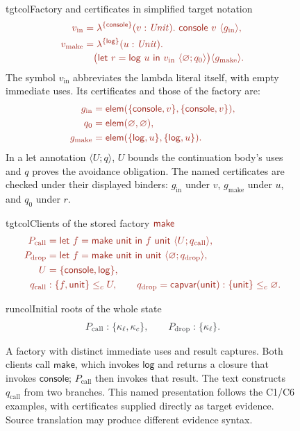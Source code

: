 \begin{figure}[!hbp]
\begin{examplepanel}{tgtcol}{Factory and certificates in simplified target notation}
\small
\[
\tgt{\begin{aligned}
 v_{\mathrm{in}}
   &=\lambda^{\{\ev{console}\}}(v:\ty{Unit}).\
      \ev{console}\ v\ \langle g_{\mathrm{in}}\rangle,\\
 v_{\mathrm{make}}
   &=\lambda^{\{\ev{log}\}}(u:\ty{Unit}).\\[-2pt]
   &\quad
      \bigl(\ev{let}\ r=\ev{log}\ u\ \ev{in}\
         v_{\mathrm{in}}\ \langle\varnothing;q_0\rangle\bigr)
       \langle g_{\mathrm{make}}\rangle .
\end{aligned}}
\]
The symbol \(v_{\mathrm{in}}\) abbreviates the lambda literal itself,
with empty immediate uses. Its certificates and those of the factory are:
\[
\tgt{\begin{aligned}
 g_{\mathrm{in}}&=\ev{elem}(\{\ev{console},v\},\{\ev{console},v\}),\\
 q_0&=\ev{elem}(\varnothing,\varnothing),\\
 g_{\mathrm{make}}&=\ev{elem}(\{\ev{log},u\},\{\ev{log},u\}).
\end{aligned}}
\]
In a let annotation \(\langle U;q\rangle\), \(U\) bounds the continuation
body's uses and \(q\) proves the avoidance obligation.
The named certificates are checked under their displayed binders:
\(g_{\mathrm{in}}\) under \(v\), \(g_{\mathrm{make}}\) under \(u\),
and \(q_0\) under \(r\).
\end{examplepanel}
\begin{examplepanel}{tgtcol}{Clients of the stored factory \(\ev{make}\)}
\small
\[
\tgt{\begin{aligned}
 P_{\mathrm{call}}
   &=\ev{let}\ f=\ev{make}\ \ev{unit}\ \ev{in}\
      f\ \ev{unit}\ \langle U;q_{\mathrm{call}}\rangle,\\
 P_{\mathrm{drop}}
   &=\ev{let}\ f=\ev{make}\ \ev{unit}\ \ev{in}\
      \ev{unit}\ \langle\varnothing;q_{\mathrm{drop}}\rangle,\\
 U&=\{\ev{console},\ev{log}\},\\
 q_{\mathrm{call}}&:\{f,\ev{unit}\}\le_c U,\qquad
 q_{\mathrm{drop}}=\ev{capvar}(\ev{unit}):\{\ev{unit}\}\le_c\varnothing.
\end{aligned}}
\]
\end{examplepanel}
\begin{examplepanel}{runcol}{Initial roots of the whole state}
\[
\run{P_{\mathrm{call}}:\{\kappa_\ell,\kappa_c\},
      \qquad P_{\mathrm{drop}}:\{\kappa_\ell\}.}
\]
\end{examplepanel}
\caption{A factory with distinct immediate uses and result captures.
Both clients call \(\mathsf{make}\), which invokes \(\mathsf{log}\) and
returns a closure that invokes \(\mathsf{console}\);
\(P_{\mathrm{call}}\) then invokes that result.
The text constructs \(q_{\mathrm{call}}\) from two branches. This named
presentation follows the C1/C6 examples, with certificates supplied
directly as target evidence. Source translation may produce different
evidence syntax.}
\label{fig:factory}
\end{figure}
